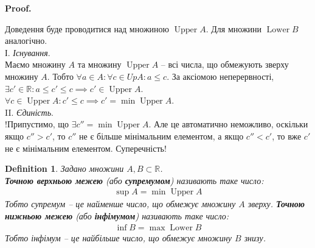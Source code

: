 \documentclass[a4paper, 14pt]{article}
\makeatletter
\def\qed{$\blacksquare$}
\theoremstyle{theoremdd}
\theoremstyle{theoremdd}
\newtheorem{definition}[theorem]{Definition}
\theoremstyle{theoremdd}
\theoremstyle{theoremdd}
\theoremstyle{theoremdd}
\theoremstyle{theoremdd}
\theoremstyle{theoremdd}
\theoremstyle{theoremdd}
\renewenvironment{proof}[1][Proof.\\]{\par
\pushQED{\hfill \qed}%
\normalfont \topsep6\p@\@plus6\p@\relax
\trivlist
\item\relax
{\bfseries
#1\@addpunct{.}}\hspace\labelsep\ignorespaces
}{%
\popQED\endtrivlist\@endpefalse
}
\DeclareMathOperator{\Up}{Upper}
\DeclareMathOperator{\Low}{Lower}
\makeatother
\begin{document}
	\begin{proof}
	Доведення буде проводитися над множиною $\Up A$. Для множини $\Low B$ аналогічно.\\
	І. \textit{Існування}.\\
	Маємо множину $A$ та множину $\Up A$ -- всі числа, що обмежують зверху множину $A$. Тобто $\forall a \in A: \forall c \in UpA: a \leq c$. За аксіомою неперервності, $\exists c' \in \mathbb{R}: a \leq c' \leq c \implies c' \in \Up A$.\\
	$\forall c \in \Up A: c' \leq c \implies c' = \min \Up A$.
	\bigskip \\
	II. \textit{Єдиність}.\\
	!Припустимо, що $\exists c'' = \min \Up A$. Але це автоматично неможливо, оскільки якщо $c'' > c'$, то $c''$ не є більше мінімальним елементом, а якщо $c'' < c'$, то вже $c'$ не є мінімальним елементом. Суперечність!
	\end{proof}
	
	\begin{definition} Задано множини $A,B \subset \mathbb{R}$.\\
	\textbf{Точною верхньою межею} (або \textbf{супремумом}) називають таке число:
	\begin{align*}
	\sup A = \min \Up A
	\end{align*}
	Тобто супремум -- це найменше число, що обмежує множину $A$ зверху.
	\textbf{Точною нижньою межею} (або \textbf{інфімумом}) називають таке число:
	\begin{align*}
	\inf B = \max \Low B
	\end{align*}
	Тобто інфімум -- це найбільше число, що обмежує множину $B$ знизу.
	\end{definition}
	
\end{document}
